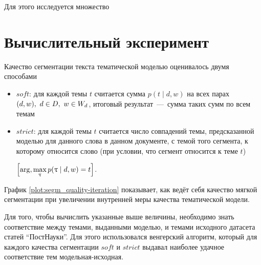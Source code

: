   Для этого исследуется множество


\section{Вычислительный эксперимент}




  Качество сегментации текста тематической моделью оценивалось двумя способами
  \begin{itemize}
  \item
    $soft$: для каждой темы $t$ считается сумма $p(t \mid d, w)$ на всех парах $(d, w),\ d \hm\in D,\ w \hm\in W_d$, итоговый результат~---~сумма таких сумм по всем темам
  \item
    $strict$: для каждой темы $t$ считается число совпадений темы, предсказанной моделью для данного слова в данном документе, с темой того сегмента, к которому относится слово (при условии, что сегмент относится к теме $t$)\par
    $\Bigl[\arg,\max\limits_{\tau} p(\tau \mid d, w) \hm= t\Bigr]$.
  \end{itemize}
 График \ref{plot:segm_quality-iteration} показывает, как ведёт себя качество мягкой сегментации при увеличении внутренней меры качества тематической модели.

  Для того, чтобы вычислить указанные выше величины, необходимо знать соответствие между темами, выданными моделью, и темами исходного датасета статей "`ПостНауки"'. Для этого использовался венгерский алгоритм,  
  который для каждого качества сегментации $soft$ и $strict$ выдавал наиболее удачное соответствие тем модельная-исходная.


